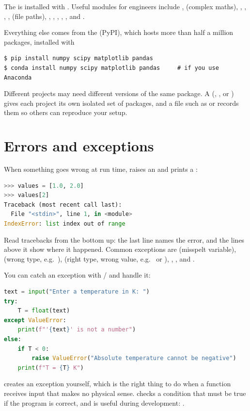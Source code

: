 The  is installed with \py. Useful modules for engineers include
,  (complex maths), , , ,
,  (file paths), , , ,
, ,  and .

Everything else comes from the  (PyPI), which hosts more than
half a million packages, installed with
\begin{lstlisting}[style=shell]
$ pip install numpy scipy matplotlib pandas
$ conda install numpy scipy matplotlib pandas     # if you use Anaconda
\end{lstlisting}
Different projects may need different versions of the same package. A  (, , or ) gives each project
its own isolated set of packages, and a file such as  or
 records them so others can reproduce your setup.

\section{Errors and exceptions}

When something goes wrong at run time, \py raises an  and prints a
:
\begin{lstlisting}[language=Python]
>>> values = [1.0, 2.0]
>>> values[2]
Traceback (most recent call last):
  File "<stdin>", line 1, in <module>
IndexError: list index out of range
\end{lstlisting}
Read tracebacks from the bottom up: the last line names the error, and the lines above it
show where it happened. Common exceptions are  (misspelt variable),
 (wrong type, e.g.\ ),  (right type,
wrong value, e.g.\  or ),
, ,  and
.

You can catch an exception with / and handle it:
\begin{lstlisting}[language=Python]
text = input("Enter a temperature in K: ")
try:
    T = float(text)
except ValueError:
    print(f"'{text}' is not a number")
else:
    if T < 0:
        raise ValueError("Absolute temperature cannot be negative")
    print(f"T = {T} K")
\end{lstlisting}
 creates an exception yourself, which is the right thing to do when a function
receives input that makes no physical sense.  checks a condition that must
be true if the program is correct, and is useful during development:
.

